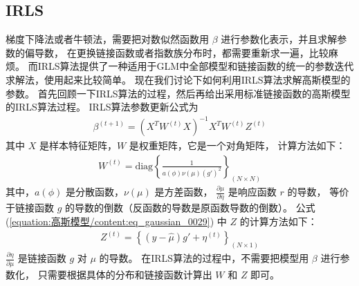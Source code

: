 \documentclass[letterpaper,10pt,english]{sphinxmanual}
\begin{document}
\subsection{IRLS}
\label{\detokenize{_u9ad8_u65af_u6a21_u578b/content:irls}}
梯度下降法或者牛顿法，需要把对数似然函数用 \(\beta\) 进行参数化表示，并且求解参数的偏导数，
在更换链接函数或者指数族分布时，都需要重新求一遍，比较麻烦。
而IRLS算法提供了一种适用于GLM中全部模型和链接函数的统一的参数迭代求解法，使用起来比较简单。
现在我们讨论下如何利用IRLS算法求解高斯模型的参数。
首先回顾一下IRLS算法的过程，然后再给出采用标准链接函数的高斯模型的IRLS算法过程。
IRLS算法参数更新公式为
\begin{equation}\label{equation:高斯模型/content:eq_gaussian_0029}
\begin{split} \beta^{(t+1)} = (X^T W^{(t)} X)^{-1} X^T W^{(t)} Z^{(t)}\end{split}
\end{equation}
其中 \(X\) 是样本特征矩阵，\(W\) 是权重矩阵，它是一个对角矩阵，
计算方法如下：
\begin{equation}\label{equation:高斯模型/content:eq_gaussian_0030}
\begin{split} W^{(t)}
= \text{diag} \left \{ \frac{ 1}{ a(\phi) \nu(\mu) ( g' )^2}
 \right \}_{(N\times N)}\end{split}
\end{equation}
其中，\(a(\phi)\) 是分散函数，\(\nu(\mu)\) 是方差函数，
\(\frac{\partial \mu}{\partial \eta}\) 是响应函数 \(r\) 的导数，
等价于链接函数 \(g\) 的导数的倒数（反函数的导数是原函数导数的倒数）。
公式(\ref{equation:高斯模型/content:eq_gaussian_0029}) 中 \(Z\) 的计算方法如下：
\begin{equation}\label{equation:高斯模型/content:高斯模型/content:13}
\begin{split}Z^{(t)} =   \left \{ (y- \hat{\mu}) g'  + \eta^{(t)}
\right \}_{(N\times 1 )}\end{split}
\end{equation}
\(\frac{\partial \eta}{\partial \mu}\) 是链接函数 \(g\) 对 \(\mu\) 的导数。
在IRLS算法的过程中，不需要把模型用 \(\beta\) 进行参数化，
只需要根据具体的分布和链接函数计算出 \(W\) 和 \(Z\) 即可。
\end{document}
